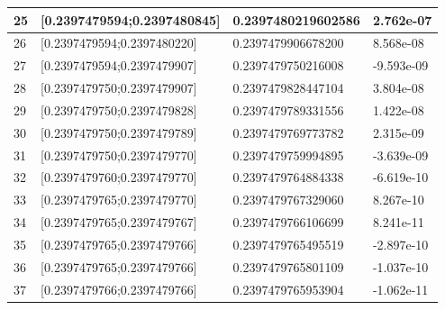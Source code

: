 \documentclass[a4paper, 11pt]{article}
\begin{document}
\begin{table}[H]
\begin{tabular}{llll}
\multicolumn{1}{|l|}{25} & \multicolumn{1}{l|}{{[}0.2397479594;0.2397480845{]}} & \multicolumn{1}{l|}{0.2397480219602586} & \multicolumn{1}{l|}{2.762e-07} \\ \hline
\multicolumn{1}{|l|}{26} & \multicolumn{1}{l|}{{[}0.2397479594;0.2397480220{]}} & \multicolumn{1}{l|}{0.2397479906678200} & \multicolumn{1}{l|}{8.568e-08} \\ \hline
\multicolumn{1}{|l|}{27} & \multicolumn{1}{l|}{{[}0.2397479594;0.2397479907{]}} & \multicolumn{1}{l|}{0.2397479750216008} & \multicolumn{1}{l|}{-9.593e-09} \\ \hline
\multicolumn{1}{|l|}{28} & \multicolumn{1}{l|}{{[}0.2397479750;0.2397479907{]}} & \multicolumn{1}{l|}{0.2397479828447104} & \multicolumn{1}{l|}{3.804e-08} \\ \hline
\multicolumn{1}{|l|}{29} & \multicolumn{1}{l|}{{[}0.2397479750;0.2397479828{]}} & \multicolumn{1}{l|}{0.2397479789331556} & \multicolumn{1}{l|}{1.422e-08} \\ \hline
\multicolumn{1}{|l|}{30} & \multicolumn{1}{l|}{{[}0.2397479750;0.2397479789{]}} & \multicolumn{1}{l|}{0.2397479769773782} & \multicolumn{1}{l|}{2.315e-09} \\ \hline
\multicolumn{1}{|l|}{31} & \multicolumn{1}{l|}{{[}0.2397479750;0.2397479770{]}} & \multicolumn{1}{l|}{0.2397479759994895} & \multicolumn{1}{l|}{-3.639e-09} \\ \hline
\multicolumn{1}{|l|}{32} & \multicolumn{1}{l|}{{[}0.2397479760;0.2397479770{]}} & \multicolumn{1}{l|}{0.2397479764884338} & \multicolumn{1}{l|}{-6.619e-10} \\ \hline
\multicolumn{1}{|l|}{33} & \multicolumn{1}{l|}{{[}0.2397479765;0.2397479770{]}} & \multicolumn{1}{l|}{0.2397479767329060} & \multicolumn{1}{l|}{8.267e-10} \\ \hline
\multicolumn{1}{|l|}{34} & \multicolumn{1}{l|}{{[}0.2397479765;0.2397479767{]}} & \multicolumn{1}{l|}{0.2397479766106699} & \multicolumn{1}{l|}{8.241e-11} \\ \hline
\multicolumn{1}{|l|}{35} & \multicolumn{1}{l|}{{[}0.2397479765;0.2397479766{]}} & \multicolumn{1}{l|}{0.2397479765495519} & \multicolumn{1}{l|}{-2.897e-10} \\ \hline
\multicolumn{1}{|l|}{36} & \multicolumn{1}{l|}{{[}0.2397479765;0.2397479766{]}} & \multicolumn{1}{l|}{0.2397479765801109} & \multicolumn{1}{l|}{-1.037e-10} \\ \hline
\multicolumn{1}{|l|}{37} & \multicolumn{1}{l|}{{[}0.2397479766;0.2397479766{]}} & \multicolumn{1}{l|}{0.2397479765953904} & \multicolumn{1}{l|}{-1.062e-11} \\ \hline

\end{tabular}
\end{table}
\end{document}
